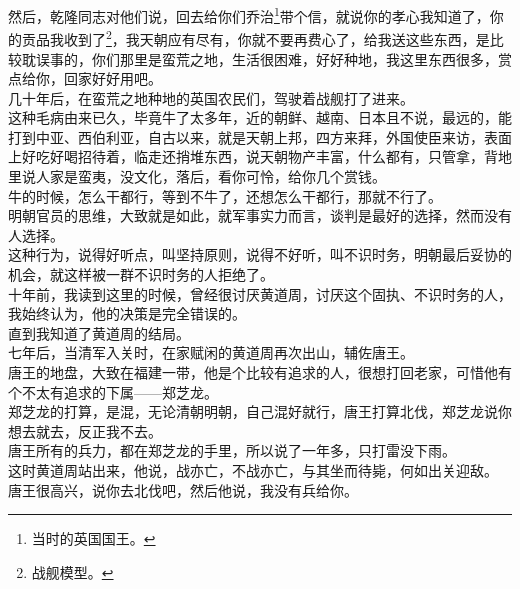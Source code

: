 \begin{multicols}{\theparacolNo}
然后，乾隆同志对他们说，回去给你们乔治\footnote{当时的英国国王。}带个信，就说你的孝心我知道了，你的贡品我收到了\footnote{战舰模型。}，我天朝应有尽有，你就不要再费心了，给我送这些东西，是比较耽误事的，你们那里是蛮荒之地，生活很困难，好好种地，我这里东西很多，赏点给你，回家好好用吧。\\

几十年后，在蛮荒之地种地的英国农民们，驾驶着战舰打了进来。\\

这种毛病由来已久，毕竟牛了太多年，近的朝鲜、越南、日本且不说，最远的，能打到中亚、西伯利亚，自古以来，就是天朝上邦，四方来拜，外国使臣来访，表面上好吃好喝招待着，临走还捎堆东西，说天朝物产丰富，什么都有，只管拿，背地里说人家是蛮夷，没文化，落后，看你可怜，给你几个赏钱。\\

牛的时候，怎么干都行，等到不牛了，还想怎么干都行，那就不行了。\\

明朝官员的思维，大致就是如此，就军事实力而言，谈判是最好的选择，然而没有人选择。\\

这种行为，说得好听点，叫坚持原则，说得不好听，叫不识时务，明朝最后妥协的机会，就这样被一群不识时务的人拒绝了。\\

十年前，我读到这里的时候，曾经很讨厌黄道周，讨厌这个固执、不识时务的人，我始终认为，他的决策是完全错误的。\\

直到我知道了黄道周的结局。\\

七年后，当清军入关时，在家赋闲的黄道周再次出山，辅佐唐王。\\

唐王的地盘，大致在福建一带，他是个比较有追求的人，很想打回老家，可惜他有个不太有追求的下属——郑芝龙。\\

郑芝龙的打算，是混，无论清朝明朝，自己混好就行，唐王打算北伐，郑芝龙说你想去就去，反正我不去。\\

唐王所有的兵力，都在郑芝龙的手里，所以说了一年多，只打雷没下雨。\\

这时黄道周站出来，他说，战亦亡，不战亦亡，与其坐而待毙，何如出关迎敌。\\

唐王很高兴，说你去北伐吧，然后他说，我没有兵给你。\\


\end{multicols}
